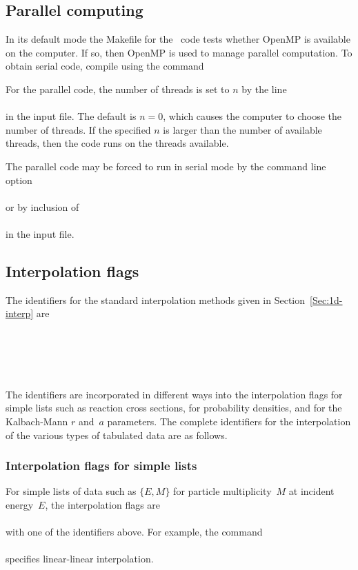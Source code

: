 \subsection{Parallel computing}
In its default mode the \textsf{Makefile} for the \gettransfer\ code
tests whether \textsf{OpenMP} is available on the computer.  If so,
then \textsf{OpenMP} is used to manage parallel computation.  To obtain 
serial code, compile using the command\\

For the parallel code, the number of threads is set to $n$ by the
line\\
  \\
in the input file.  The default is $n = 0$, which causes the computer
to choose the number of threads.  If the specified $n$ is larger than
the number of available threads, then the code runs on the threads
available.

The parallel code may be forced to run in serial mode by
the command line  option\\
  {}\\
or by inclusion of\\
 \\
in the input file.

 \subsection{Interpolation flags} \label{interp-flags}
The identifiers for the standard interpolation methods
 given in Section~\ref{Sec:1d-interp} are\\
    \\
   \\
   \\
   \\
   \\
The identifiers are incorporated in different ways into the interpolation
flags for simple lists such as reaction cross sections, for probability densities,
and for the Kalbach-Mann $r$ and~$a$ parameters.  The complete
identifiers for the interpolation of the various types of tabulated data are as follows.

\subsubsection{Interpolation flags for simple lists}\label{interp-flags-list}
 For simple lists of data such as $\{E, M\}$ for particle multiplicity~$M$ at
 incident energy~$E$, the interpolation flags are\\
   \\
with one of the identifiers above.  For example, the command\\
   \\
specifies linear-linear interpolation.

